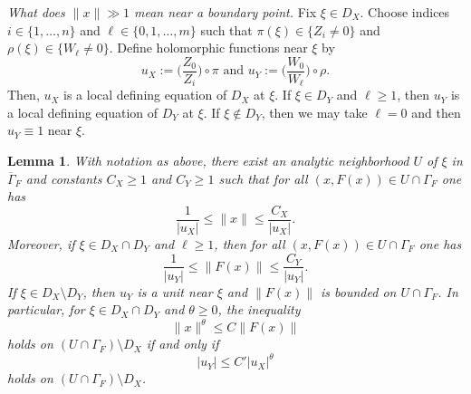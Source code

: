 \documentclass[12pt]{amsart}
\theoremstyle{plain}
\newtheorem{lemma}[theorem]{Lemma}
\theoremstyle{definition}
\numberwithin{equation}{section}
\begin{document}
\medskip
\noindent\textit{What does $\|x\|\gg 1$ mean near a boundary point.}
Fix $\xi\in D_X$.
Choose indices $i\in\{1,\dots,n\}$ and $\ell\in\{0,1,\dots,m\}$ such that
$\pi(\xi)\in\{Z_i\neq 0\}$ and $\rho(\xi)\in\{W_\ell\neq 0\}$.
Define holomorphic functions near $\xi$ by
\[
u_X:=\Big(\frac{Z_0}{Z_i}\Big)\circ\pi \text{ and } u_Y:=\Big(\frac{W_0}{W_\ell}\Big)\circ\rho.
\]
Then, $u_X$ is a local defining equation of $D_X$ at $\xi$.
If $\xi\in D_Y$ and $\ell\ge 1$, then $u_Y$ is a local defining equation of $D_Y$ at $\xi$.
If $\xi\notin D_Y$, then we may take $\ell=0$ and then $u_Y\equiv 1$ near $\xi$.

\begin{lemma}\label{lem:norms-vs-uX-uY}
With notation as above, there exist an analytic neighborhood $U$ of $\xi$ in
$\overline{\Gamma}_F$ and constants $C_X\ge 1$ and $C_Y\ge 1$ such that
for all $(x,F(x))\in U\cap\Gamma_F$ one has
\begin{equation}\label{eq:norm-uX}
\frac{1}{|u_X|}\le \|x\|\le \frac{C_X}{|u_X|}.
\end{equation}
Moreover, if $\xi\in D_X\cap D_Y$ and $\ell\ge 1$, then for all $(x,F(x))\in U\cap\Gamma_F$ one has
\begin{equation}\label{eq:norm-uY}
\frac{1}{|u_Y|}\le \|F(x)\|\le \frac{C_Y}{|u_Y|}.
\end{equation}
If $\xi\in D_X\setminus D_Y$, then $u_Y$ is a unit near $\xi$ and $\|F(x)\|$ is bounded on
$U\cap\Gamma_F$.
In particular, for $\xi\in D_X\cap D_Y$ and $\theta\ge 0$, the inequality
\[
\|x\|^\theta \le C\|F(x)\|
\]
holds on $(U\cap\Gamma_F)\setminus D_X$ if and only if
\begin{equation}\label{eq:uY-uX-theta}
|u_Y|\le C'|u_X|^\theta
\end{equation}
holds on $(U\cap\Gamma_F)\setminus D_X$.
\end{lemma}
\end{document}
